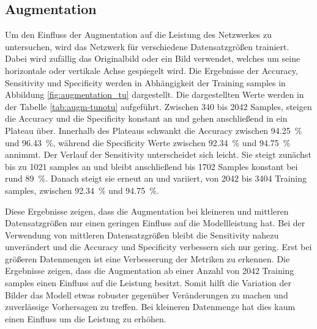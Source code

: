 \subsection{Augmentation}
Um den Einfluss der Augmentation auf die Leistung des Netzwerkes zu untersuchen, wird das Netzwerk für verschiedene Datensatzgrößen trainiert.
Dabei wird zufällig das Originalbild oder ein Bild verwendet, welches um seine horizontale oder vertikale Achse gespiegelt wird. 
Die Ergebnisse der Accuracy, Sensitivity und Specificity werden in Abhängigkeit der Training samples in Abbildung \ref{fig:augmentation_tu} dargestellt.
Die dargestellten Werte werden in der Tabelle \ref{tab:augm-tunotu} aufgeführt.
Zwischen 340 bis 2042 Samples, steigen die Accuracy und die Specificity konstant an und gehen anschließend in ein Plateau über.
Innerhalb des Plateaus schwankt die Accuracy zwischen \SI{94.25}{\percent} und \SI{96.43}{\percent}, während die Specificity Werte zwischen \SI{92.34}{\percent} und \SI{94.75}{\percent} annimmt.
Der Verlauf der Sensitivity unterscheidet sich leicht.
Sie steigt zunächst bis zu 1021 samples an und bleibt anschließend bis 1702 Samples konstant bei rund \SI{89}{\%}.
Danach steigt sie erneut an und variiert, von 2042 bis 3404 Training samples, zwischen \SI{92.34}{\%} und \SI{94.75}{\%}.

Diese Ergebnisse zeigen, dass die Augmentation bei kleineren und mittleren Datensatzgrößen nur einen geringen Einfluss auf die Modellleistung hat.
Bei der Verwendung von mittleren Datensatzgrößen bleibt die Sensitivity nahezu unverändert und die Accuracy und Specificity verbessern sich nur gering.
Erst bei größeren Datenmengen ist eine Verbesserung der Metriken zu erkennen. 
Die Ergebnisse zeigen, dass die Augmentation ab einer Anzahl von 2042 Training samples einen Einfluss auf die Leistung besitzt.
Somit hilft die Variation der Bilder das Modell etwas robuster gegenüber Veränderungen zu machen und zuverlässige Vorhersagen zu treffen.
Bei kleineren Datenmenge hat dies kaum einen Einfluss um die Leistung zu erhöhen. 

